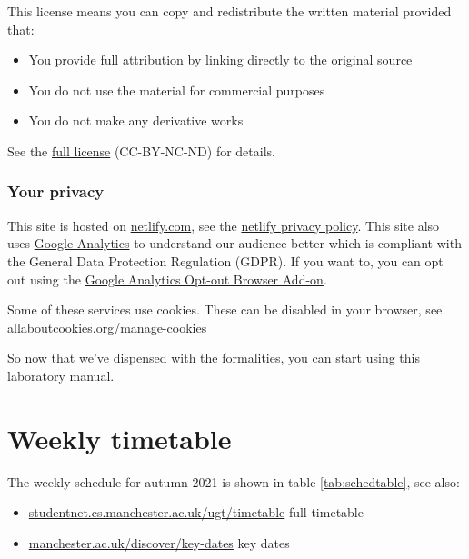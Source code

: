 \documentclass[
]{book}
\providecommand{\tightlist}{%
  \setlength{\itemsep}{0pt}\setlength{\parskip}{0pt}}
\begin{document}
This license means you can copy and redistribute the written material provided that:

\begin{itemize}
\tightlist
\item
  You provide full attribution by linking directly to the original source
\item
  You do not use the material for commercial purposes
\item
  You do not make any derivative works
\end{itemize}

See the \href{https://creativecommons.org/licenses/by-nc-nd/3.0/}{full license} (CC-BY-NC-ND) for details.

\hypertarget{privacy}{%
\subsection{Your privacy}\label{privacy}}

This site is hosted on \href{https://www.netlify.com/}{netlify.com}, see the \href{https://www.netlify.com/privacy/}{netlify privacy policy}. This site also uses \href{https://en.wikipedia.org/wiki/Google_Analytics}{Google Analytics} to understand our audience better which is compliant with the General Data Protection Regulation (GDPR). If you want to, you can opt out using the \href{https://tools.google.com/dlpage/gaoptout/}{Google Analytics Opt-out Browser Add-on}.

Some of these services use cookies. These can be disabled in your browser, see \href{https://www.allaboutcookies.org/manage-cookies/}{allaboutcookies.org/manage-cookies}

So now that we've dispensed with the formalities, you can start using this laboratory manual.









\hypertarget{timetabling}{%
\chapter*{Weekly timetable}\label{timetabling}}

The weekly schedule for autumn 2021 is shown in table \ref{tab:schedtable}, see also:

\begin{itemize}
\tightlist
\item
  \href{https://studentnet.cs.manchester.ac.uk/ugt/timetable}{studentnet.cs.manchester.ac.uk/ugt/timetable} full timetable
\item
  \href{https://www.manchester.ac.uk/discover/key-dates/}{manchester.ac.uk/discover/key-dates} key dates
\end{itemize}
\end{document}

